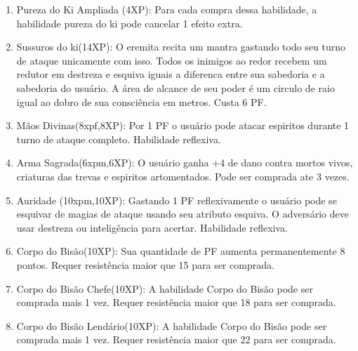 \begin{enumerate}
	
\item Pureza do Ki Ampliada (4XP): Para cada compra dessa habilidade, a habilidade pureza do ki pode cancelar 1 efeito extra.
	
	\item Sussuros do ki(14XP): O eremita recita um mantra gastando todo seu turno de ataque unicamente com isso. Todos os inimigos ao redor recebem um redutor em destreza e esquiva iguais a diferenca entre sua sabedoria e a sabedoria do usuário. A área de alcance de seu poder é um circulo de raio igual ao dobro de sua consciência em metros. Custa 6 PF.

	\item Mãos Divinas(8xpf,8XP): Por 1 PF o usuário pode atacar espiritos durante 1 turno de ataque completo. Habilidade reflexiva.

\item Arma Sagrada(6xpm,6XP): O usuário ganha +4 de dano contra mortos vivos, criaturas das trevas e espiritos artomentados. Pode ser comprada ate 3 vezes.

		\item Auridade (10xpm,10XP): Gastando 1 PF reflexivamente o usuário pode se esquivar de magias de ataque usando seu atributo esquiva. O adversário deve usar destreza ou inteligência para acertar. Habilidade reflexiva.


	\item Corpo do Bisão(10XP): Sua quantidade de PF aumenta permanentemente 8 pontos. Requer resistência maior que 15 para ser comprada. 
	
	\item Corpo do Bisão Chefe(10XP): A habilidade Corpo do Bisão pode ser comprada mais 1 vez. Requer resistência maior que 18 para ser comprada.

	\item Corpo do Bisão Lendário(10XP): A habilidade Corpo do Bisão pode ser comprada mais 1 vez. Requer resistência maior que 22 para ser comprada.


\end{enumerate}
